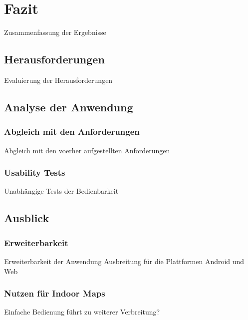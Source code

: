 \chapter{Fazit}
Zusammenfassung der Ergebnisse

\section{Herausforderungen}
Evaluierung der Herausforderungen

\section{Analyse der Anwendung}

\subsection{Abgleich mit den Anforderungen}
Abgleich mit den voerher aufgestellten Anforderungen
\subsection{Usability Tests}
Unabhängige Tests der Bedienbarkeit

\section{Ausblick}
\subsection{Erweiterbarkeit}
Erweiterbarkeit der Anwendung
Ausbreitung für die Plattformen Android und Web
\subsection{Nutzen für Indoor Maps}
Einfache Bedienung führt zu weiterer Verbreitung?
